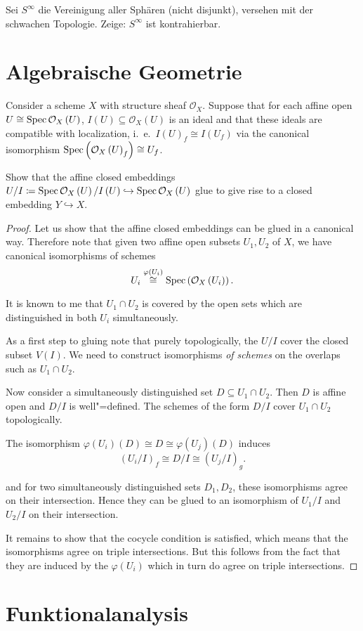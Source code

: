 \documentclass[ngerman, 11pt, a4paper, twoside, abstracton]{scrbook}
\begin{document}
\begin{exercise}
  Sei $S^\infty$ die Vereinigung aller Sphären (nicht disjunkt), versehen mit der schwachen Topologie. Zeige: $S^\infty$ ist kontrahierbar.
\end{exercise}
\section{Algebraische Geometrie}

\begin{exercise}
  Consider a scheme $X$ with structure sheaf $\mathcal O_X$. Suppose that for each affine open $U \cong \operatorname{Spec} \mathcal O_X\left( U \right)$, $I\left( U \right) \subseteq \mathcal O_X\left( U \right)$ is an ideal and that these ideals are compatible with localization, i.\ e.\ $I\left( U \right)_f \cong I\left( U_f \right)$ via the canonical isomorphism $\operatorname{Spec} \left(\mathcal O_X\left( U \right)_f\right) \cong U_f$.

  Show that the affine closed embeddings $U/I \coloneqq \operatorname{Spec} \mathcal O_X\left( U \right)/I\left( U \right) \hookrightarrow \operatorname{Spec}\mathcal O_X\left( U \right)$ glue to give rise to a closed embedding $Y\hookrightarrow X$.
\end{exercise}
\begin{proof}
  Let us show that the affine closed embeddings can be glued in a canonical way. Therefore note that given two affine open subsets $U_1, U_2$ of $X$, we have canonical isomorphisms of schemes
  \[
    U_i \overset{\varphi\left( U_i \right)}{\cong} \operatorname{Spec}\left( \mathcal O_X\left( U_i \right) \right).
  \]

  It is known to me that $U_1\cap U_2$ is covered by the open sets which are distinguished in both $U_i$ simultaneously.

  As a first step to gluing note that purely topologically, the $U/I$ cover the closed subset $V\left( I \right)$. We need to construct isomorphisms \textit{of schemes} on the overlaps such as $U_1 \cap U_2$.

  Now consider a simultaneously distinguished set $D \subseteq U_1\cap U_2$. Then $D$ is affine open and $D/I$ is well"=defined. The schemes of the form $D/I$ cover $U_1 \cap U_2$ topologically. 

  The isomorphism $\varphi\left( U_i \right)\left( D \right) \cong D \cong \varphi\left( U_j \right)\left( D \right)$ induces
  \[
    (U_i/I)_f \cong D/I \cong (U_j/I)_g.
  \]

  and for two simultaneously distinguished sets $D_1, D_2$, these isomorphisms agree on their intersection. Hence they can be glued to an isomorphism of $U_1/I$ and $U_2/I$ on their intersection.

  It remains to show that the cocycle condition is satisfied, which means that the isomorphisms agree on triple intersections. But this follows from the fact that they are induced by the $\varphi\left( U_i \right)$ which in turn do agree on triple intersections.
\end{proof}

\section{Funktionalanalysis}
\end{document}
